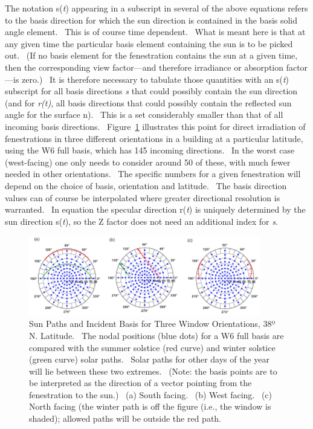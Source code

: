 The notation s(\emph{t}) appearing in a subscript in several of the above equations refers to the basis direction for which the sun direction is contained in the basis solid angle element.~ This is of course time dependent.~ What is meant here is that at any given time the particular basis element containing the sun is to be picked out.~ (If no basis element for the fenestration contains the sun at a given time, then the corresponding view factor---and therefore irradiance or absorption factor---is zero.)~ It is therefore necessary to tabulate those quantities with an s(\emph{t}) subscript for all basis directions \emph{s} that could possibly contain the sun direction (and for \emph{r(t)}, all basis directions that could possibly contain the reflected sun angle for the surface n).~ This is a set considerably smaller than that of all incoming basis directions.~ Figure~\ref{fig:sun-paths-and-incident-basis-for-three-window} illustrates this point for direct irradiation of fenestrations in three different orientations in a building at a particular latitude, using the W6 full basis, which has 145 incoming directions.~ In the worst case (west-facing) one only needs to consider around 50 of these, with much fewer needed in other orientations.~ The specific numbers for a given fenestration will depend on the choice of basis, orientation and latitude.~ The basis direction values can of course be interpolated where greater directional resolution is warranted.~ In equation the specular direction r(\emph{t}) is uniquely determined by the sun direction s(\emph{t}), so the Z factor does not need an additional index for \emph{s}.

\begin{figure}[hbtp] %
\centering
\includegraphics[width=0.9\textwidth, height=0.9\textheight, keepaspectratio=true]{media/image1410.png}
\caption{Sun Paths and Incident Basis for Three Window Orientations, 38º N. Latitude.  The nodal positions (blue dots) for a W6 full basis are compared with the summer solstice (red curve) and winter solstice (green curve) solar paths.  Solar paths for other days of the year will lie between these two extremes.  (Note: the basis points are to be interpreted as the direction of a vector pointing from the fenestration to the sun.)  (a) South facing.  (b) West facing.  (c) North facing (the winter path is off the figure (i.e., the window is shaded); allowed paths will be outside the red path. \protect \label{fig:sun-paths-and-incident-basis-for-three-window}}
\end{figure}

